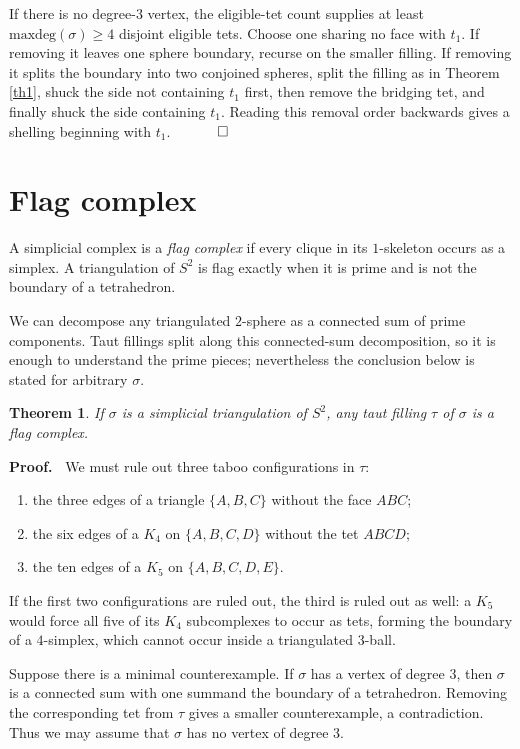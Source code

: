\documentclass[12pt]{article}
\newtheorem{theorem}{Theorem}
\newcommand{\proofstart}{{\noindent \bf Proof.\ }}
\newcommand{\proofend}{$\quad \qed$}
\newcommand{\kw}{\mathrm}
\newcommand{\maxdeg}{\kw{maxdeg}}
\begin{document}
If there is no degree-$3$ vertex, the eligible-tet count supplies at least
$\maxdeg(\sigma)\geq 4$ disjoint eligible tets.  Choose one sharing no face
with $t_1$.  If removing it leaves one sphere boundary, recurse on the smaller
filling.  If removing it splits the boundary into two conjoined spheres, split
the filling as in Theorem \ref{th1}, shuck the side not containing $t_1$ first,
then remove the bridging tet, and finally shuck the side containing $t_1$.
Reading this removal order backwards gives a shelling beginning with $t_1$.
\proofend

\section{Flag complex}

A simplicial complex is a \emph{flag complex} if every clique in its
$1$-skeleton occurs as a simplex.  A triangulation of $S^2$ is flag exactly
when it is prime and is not the boundary of a tetrahedron.

We can decompose any triangulated $2$-sphere as a connected sum of prime
components.  Taut fillings split along this connected-sum decomposition, so
it is enough to understand the prime pieces; nevertheless the conclusion
below is stated for arbitrary $\sigma$.

\begin{theorem} \label{th4}
If $\sigma$ is a simplicial triangulation of $S^2$, any taut filling $\tau$ of
$\sigma$ is a flag complex.
\end{theorem}

\proofstart
We must rule out three taboo configurations in $\tau$:
\begin{enumerate}
\item the three edges of a triangle $\{A,B,C\}$ without the face $ABC$;
\item the six edges of a $K_4$ on $\{A,B,C,D\}$ without the tet $ABCD$;
\item the ten edges of a $K_5$ on $\{A,B,C,D,E\}$.
\end{enumerate}
If the first two configurations are ruled out, the third is ruled out as
well: a $K_5$ would force all five of its $K_4$ subcomplexes to occur as tets,
forming the boundary of a $4$-simplex, which cannot occur inside a triangulated
$3$-ball.

Suppose there is a minimal counterexample.  If $\sigma$ has a vertex of
degree $3$, then $\sigma$ is a connected sum with one summand the boundary of
a tetrahedron.  Removing the corresponding tet from $\tau$ gives a smaller
counterexample, a contradiction.  Thus we may assume that $\sigma$ has no
vertex of degree $3$.
\end{document}

